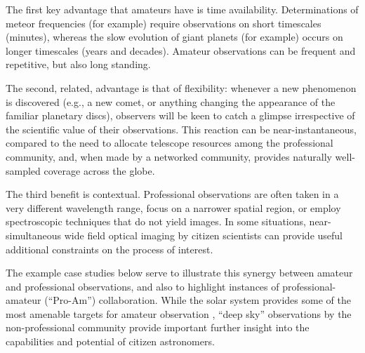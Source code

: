 \documentclass{ar2e}
\begin{document}
The first key advantage that amateurs have is time availability. Determinations
of meteor frequencies (for example) require observations on short timescales
(minutes), whereas the slow evolution of giant planets (for example) occurs on
longer timescales (years and decades).  Amateur observations can be frequent and
repetitive, but also long standing. 

The second, related, advantage is that of flexibility: whenever a new phenomenon
is discovered (e.g., a new comet, or anything changing the appearance of the
familiar planetary discs), observers will be keen to catch a glimpse
irrespective of the scientific value of their observations.  This reaction can
be near-instantaneous, compared to the need to allocate telescope resources
among the professional community, and, when made by a networked community,
provides naturally well-sampled coverage across the globe.

The third benefit is contextual.  Professional observations are often taken in a
very different wavelength range, focus on a narrower spatial region, or employ
spectroscopic techniques that do not yield images. In some situations,
near-simultaneous wide field optical imaging by citizen scientists can provide
useful additional constraints on the process of interest.

The example case studies below serve to illustrate this synergy between amateur
and professional observations, and also to highlight instances of
professional-amateur (``Pro-Am'') collaboration. While the solar system provides
some of the most amenable targets for amateur observation \citep{14mousis_proam}, ``deep sky''
observations by the non-professional community provide important further insight
into the capabilities and potential of citizen astronomers.


\end{document}
